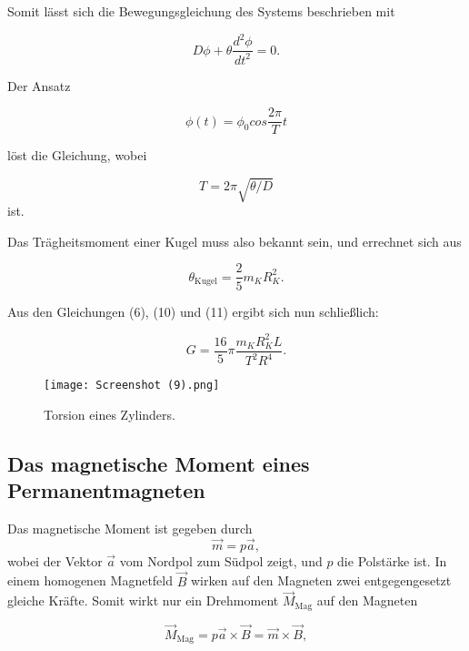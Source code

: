 Somit lässt sich die Bewegungsgleichung des Systems beschrieben mit

\begin{equation}
  D\phi + \theta \frac{d^{2}\phi}{dt^{2}} = 0 .
\end{equation}

Der Ansatz

\begin{equation}
  \phi(t) = \phi_0 cos \frac{2\pi}{T}t 
\end{equation}

löst die Gleichung, wobei

\begin{equation}
  T = 2 \pi \sqrt{\theta/D}  
\end{equation}
ist.

Das Trägheitsmoment einer Kugel muss also bekannt sein, und errechnet sich aus

\begin{equation}
  \theta_\text{Kugel} = \frac{2}{5}m_K R_K^{2} .
\end{equation}

Aus den Gleichungen (6), (10) und (11) ergibt sich nun schließlich:

\begin{equation}
 G = \frac{16}{5}\pi \frac{m_K R_K^{2}L}{T^{2}R^{4}} .
\end{equation}

\begin{figure}[H]
 \centering
  \texttt{[image: Screenshot (9).png]}
  \caption{Torsion eines Zylinders.\cite{kent}}
  \label{fig:drill}
\end{figure}


\subsection{Das magnetische Moment eines Permanentmagneten}
Das magnetische Moment ist gegeben durch
\begin{equation}
  \vec{m} = p \vec{a} ,
\end{equation}
wobei der Vektor $\vec{a}$ vom Nordpol zum Südpol zeigt, und $p$ die Polstärke ist.
In einem homogenen Magnetfeld $\vec{B}$ wirken auf den Magneten zwei entgegengesetzt gleiche Kräfte. Somit wirkt nur ein Drehmoment $\vec{M}_\text{Mag}$
auf den Magneten

\begin{equation}
  \vec{M}_\text{Mag} = p \vec{a} \times \vec{B} = \vec{m} \times \vec{B} ,
\end{equation}

